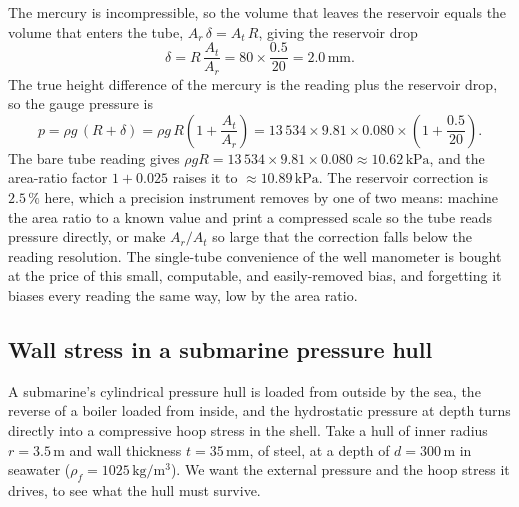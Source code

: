 The mercury is incompressible, so the volume that leaves the reservoir
equals the volume that enters the tube, $A_r\,\delta = A_t\,R$, giving the
reservoir drop
\[
\delta = R\,\frac{A_t}{A_r}
= 80 \times \frac{0.5}{20}
= 2.0\,\si{\milli\meter}.
\]
The true height difference of the mercury is the reading plus the reservoir
drop, so the gauge pressure is
\[
p = \rho g\,(R + \delta)
= \rho g\, R\left(1 + \frac{A_t}{A_r}\right)
= 13\,534 \times 9.81 \times 0.080 \times \left(1 + \frac{0.5}{20}\right).
\]
The bare tube reading gives $\rho g R = 13\,534 \times 9.81 \times 0.080
\approx 10.62\,\text{kPa}$, and the area-ratio factor $1 + 0.025$ raises it
to $\approx 10.89\,\text{kPa}$. The reservoir correction is $2.5\,\%$ here,
which a precision instrument removes by one of two means: machine the area
ratio to a known value and print a compressed scale so the tube reads
pressure directly, or make $A_r/A_t$ so large that the correction falls
below the reading resolution. The single-tube convenience of the well
manometer is bought at the price of this small, computable, and
easily-removed bias, and forgetting it biases every reading the same way,
low by the area ratio.



\subsection{Wall stress in a submarine pressure hull}

A submarine's cylindrical pressure hull is loaded from outside by the sea,
the reverse of a boiler loaded from inside, and the hydrostatic pressure at
depth turns directly into a compressive hoop stress in the shell. Take a
hull of inner radius $r = 3.5\,\si{\meter}$ and wall thickness $t = 35\,\si{
\milli\meter}$, of steel, at a depth of $d = 300\,\si{\meter}$ in seawater
($\rho_f = 1025\,\si{\kilogram\per\meter\cubed}$). We want the external
pressure and the hoop stress it drives, to see what the hull must survive.

